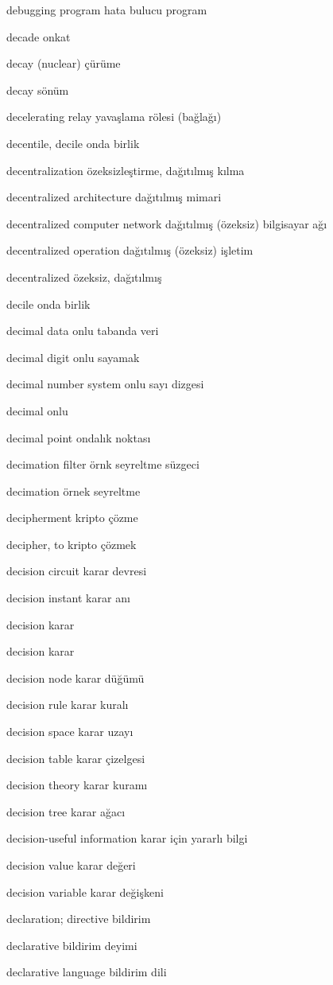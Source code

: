 \documentclass[12pt,fleqn]{article}\usepackage{../../common}
\begin{document}
debugging program hata bulucu program

decade onkat

decay (nuclear) çürüme

decay sönüm

decelerating relay yavaşlama rölesi (bağlağı)

decentile, decile onda birlik

decentralization özeksizleştirme, dağıtılmış kılma

decentralized architecture dağıtılmış mimari

decentralized computer network dağıtılmış (özeksiz) bilgisayar ağı

decentralized operation dağıtılmış (özeksiz) işletim

decentralized özeksiz, dağıtılmış

decile onda birlik

decimal data onlu tabanda veri

decimal digit onlu sayamak

decimal number system onlu sayı dizgesi

decimal onlu

decimal point ondalık noktası

decimation filter örnk seyreltme süzgeci

decimation örnek seyreltme

decipherment kripto çözme

decipher, to kripto çözmek

decision circuit karar devresi

decision instant karar anı

decision karar

decision karar

decision node karar düğümü

decision rule karar kuralı

decision space karar uzayı

decision table karar çizelgesi

decision theory karar kuramı

decision tree karar ağacı

decision-useful information karar için yararlı bilgi

decision value karar değeri

decision variable karar değişkeni

declaration; directive bildirim

declarative bildirim deyimi

declarative language bildirim dili
\end{document}
